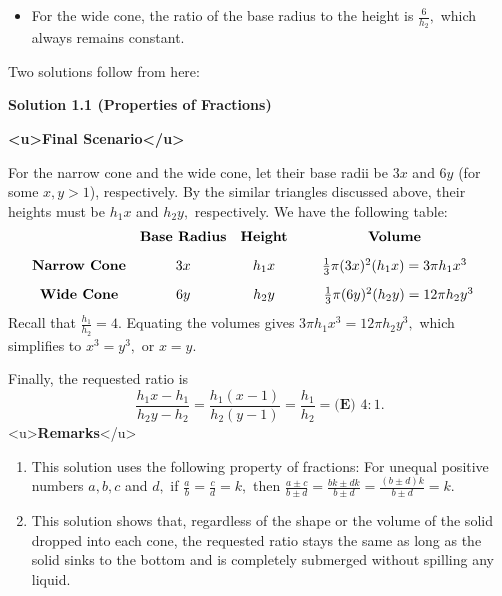\begin{enumerate}
            \begin{itemize}
        \item For the wide cone, the ratio of the base radius to the height is $\frac{6}{h_2},$ which always remains constant.
            \end{itemize}
            Two solutions follow from here:

 



\textbf{Solution 1.1 (Properties of Fractions)}

\textbf{<u>Final Scenario</u>}

 For the narrow cone and the wide cone, let their base radii be $3x$ and $6y$ (for some $x,y>1$), respectively. By the similar triangles discussed above, their heights must be $h_1x$ and $h_2y,$ respectively. We have the following table:
 \[\begin{array}{cccccc} & \textbf{Base Radius} & \textbf{Height} & & \textbf{Volume} & \\ [2ex] \textbf{Narrow Cone} & 3x & h_1x & & \frac13\pi(3x)^2(h_1x)=3\pi h_1 x^3 & \\ [2ex] \textbf{Wide Cone} & 6y & h_2y & & \hspace{2.0625mm}\frac13\pi(6y)^2(h_2y)=12\pi h_2 y^3 & \end{array}\]Recall that $\frac{h_1}{h_2}=4.$ Equating the volumes gives $3\pi h_1 x^3=12\pi h_2 y^3,$ which simplifies to $x^3=y^3,$ or $x=y.$

 Finally, the requested ratio is 
 \[\frac{h_1 x - h_1}{h_2 y - h_2}=\frac{h_1 (x-1)}{h_2 (y-1)}=\frac{h_1}{h_2}=\boxed{\textbf{(E) }4:1}.\]<u>\textbf{Remarks}</u>

            \begin{enumerate} 
        \item This solution uses the following property of fractions:  For unequal positive numbers $a,b,c$ and $d,$ if $\frac ab = \frac cd = k,$ then $\frac{a\pm c}{b\pm d}=\frac{bk\pm dk}{b\pm d}=\frac{(b\pm d)k}{b\pm d}=k.$


        \item This solution shows that, regardless of the shape or the volume of the solid dropped into each cone, the requested ratio stays the same as long as the solid sinks to the bottom and is completely submerged without spilling any liquid.

            \end{enumerate}
            




\end{enumerate}
